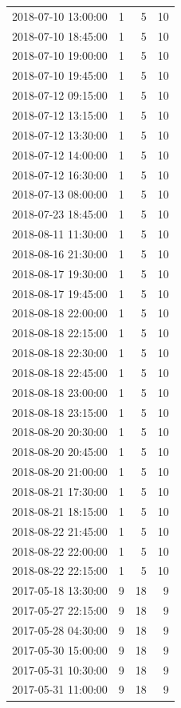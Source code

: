 \begin{tabular}{lrrr}
2018-07-10 13:00:00 & 1 & 5 & 10 \\
2018-07-10 18:45:00 & 1 & 5 & 10 \\
2018-07-10 19:00:00 & 1 & 5 & 10 \\
2018-07-10 19:45:00 & 1 & 5 & 10 \\
2018-07-12 09:15:00 & 1 & 5 & 10 \\
2018-07-12 13:15:00 & 1 & 5 & 10 \\
2018-07-12 13:30:00 & 1 & 5 & 10 \\
2018-07-12 14:00:00 & 1 & 5 & 10 \\
2018-07-12 16:30:00 & 1 & 5 & 10 \\
2018-07-13 08:00:00 & 1 & 5 & 10 \\
2018-07-23 18:45:00 & 1 & 5 & 10 \\
2018-08-11 11:30:00 & 1 & 5 & 10 \\
2018-08-16 21:30:00 & 1 & 5 & 10 \\
2018-08-17 19:30:00 & 1 & 5 & 10 \\
2018-08-17 19:45:00 & 1 & 5 & 10 \\
2018-08-18 22:00:00 & 1 & 5 & 10 \\
2018-08-18 22:15:00 & 1 & 5 & 10 \\
2018-08-18 22:30:00 & 1 & 5 & 10 \\
2018-08-18 22:45:00 & 1 & 5 & 10 \\
2018-08-18 23:00:00 & 1 & 5 & 10 \\
2018-08-18 23:15:00 & 1 & 5 & 10 \\
2018-08-20 20:30:00 & 1 & 5 & 10 \\
2018-08-20 20:45:00 & 1 & 5 & 10 \\
2018-08-20 21:00:00 & 1 & 5 & 10 \\
2018-08-21 17:30:00 & 1 & 5 & 10 \\
2018-08-21 18:15:00 & 1 & 5 & 10 \\
2018-08-22 21:45:00 & 1 & 5 & 10 \\
2018-08-22 22:00:00 & 1 & 5 & 10 \\
2018-08-22 22:15:00 & 1 & 5 & 10 \\
2017-05-18 13:30:00 & 9 & 18 & 9 \\
2017-05-27 22:15:00 & 9 & 18 & 9 \\
2017-05-28 04:30:00 & 9 & 18 & 9 \\
2017-05-30 15:00:00 & 9 & 18 & 9 \\
2017-05-31 10:30:00 & 9 & 18 & 9 \\
2017-05-31 11:00:00 & 9 & 18 & 9 \\

\end{tabular}
